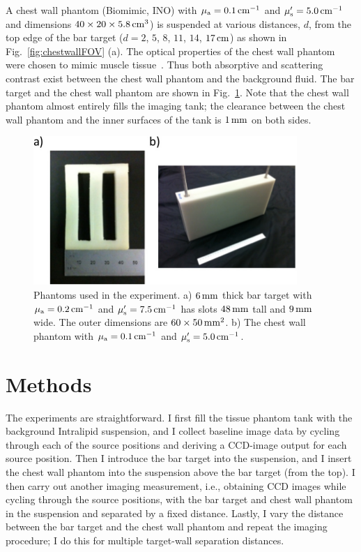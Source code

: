 A chest wall phantom (Biomimic, INO) with $\mu_{\rm a} = 0.1\,{\rm cm}^{-1}$ and $\mu_{\rm s}^\prime = 5.0\,{\rm cm}^{-1}$ and dimensions $40\times 20\times 5.8\,{\rm cm}^3$) is suspended at various distances, $d$, from the top edge of the bar target ($d=2$, $5$, $8$, $11$, $14$, $17\,{\rm cm}$) as shown in Fig.~\ref{fig:chestwallFOV} (a). The optical properties of the chest wall phantom were chosen to mimic muscle tissue~\cite{Ardeshirpour2010, Kienle1999,Taroni2003}. Thus both absorptive and scattering contrast exist between the chest wall phantom and the background fluid. The bar target and the chest wall phantom are shown in Fig.~\ref{fig:targets}.  Note that the chest wall phantom almost entirely fills the imaging tank; the clearance between the chest wall phantom and the inner surfaces of the tank is $1\,{\rm mm}$ on both sides.

\begin{figure}[t]
\centering\includegraphics[width=10cm]{./figures/3_Chestwall/chestwallphant.pdf}
\caption[Phantoms used in chest wall experiment]{\label{fig:targets}
Phantoms used in the experiment. a) $6\,{\rm mm}$ thick bar target with $\mu_{\rm a}=0.2\,{\rm cm}^{-1}$ and $\mu_{\rm s}^{\prime}=7.5\,{\rm cm}^{-1}$ has slots $48\,{\rm mm}$ tall and $9\,{\rm mm}$ wide. The outer dimensions are $60\times 50\,{\rm mm}^2$. b) The chest wall phantom with $\mu_{\rm a}=0.1\,{\rm cm}^{-1}$ and $\mu_{\rm s}^{\prime}=5.0\,{\rm cm}^{-1}$.  }
\end{figure}

\section{Methods}
\label{sec:3_methods}
The experiments are straightforward. I first fill the tissue phantom tank with the background Intralipid suspension, and I collect baseline image data by cycling through each of the source positions and deriving a CCD-image output for each source position. Then I introduce the bar target into the suspension, and I insert the chest wall phantom into the suspension above the bar target (from the top). I then carry out another imaging measurement, i.e., obtaining CCD images while cycling through the source positions, with the bar target and chest wall phantom in the suspension and separated by a fixed distance. Lastly, I vary the distance between the bar target and the chest wall phantom and repeat the imaging procedure; I do this for multiple target-wall separation distances.

